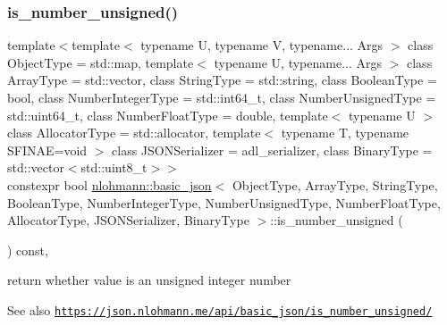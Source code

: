 \subsubsection{\texorpdfstring{is\+\_\+number\+\_\+unsigned()}{is\_number\_unsigned()}}
{\footnotesize\ttfamily template$<$template$<$ typename U, typename V, typename... Args $>$ class Object\+Type = std\+::map, template$<$ typename U, typename... Args $>$ class Array\+Type = std\+::vector, class String\+Type  = std\+::string, class Boolean\+Type  = bool, class Number\+Integer\+Type  = std\+::int64\+\_\+t, class Number\+Unsigned\+Type  = std\+::uint64\+\_\+t, class Number\+Float\+Type  = double, template$<$ typename U $>$ class Allocator\+Type = std\+::allocator, template$<$ typename T, typename S\+F\+I\+N\+A\+E=void $>$ class J\+S\+O\+N\+Serializer = adl\+\_\+serializer, class Binary\+Type  = std\+::vector$<$std\+::uint8\+\_\+t$>$$>$ \\
constexpr bool \hyperlink{classnlohmann_1_1basic__json}{nlohmann\+::basic\+\_\+json}$<$ Object\+Type, Array\+Type, String\+Type, Boolean\+Type, Number\+Integer\+Type, Number\+Unsigned\+Type, Number\+Float\+Type, Allocator\+Type, J\+S\+O\+N\+Serializer, Binary\+Type $>$\+::is\+\_\+number\+\_\+unsigned (\begin{DoxyParamCaption}{ }\end{DoxyParamCaption}) const\hspace{0.3cm}{\ttfamily [inline]}, {\ttfamily [noexcept]}}



return whether value is an unsigned integer number 

\begin{DoxySeeAlso}{See also}
\href{https://json.nlohmann.me/api/basic_json/is_number_unsigned/}{\tt https\+://json.\+nlohmann.\+me/api/basic\+\_\+json/is\+\_\+number\+\_\+unsigned/} 
\end{DoxySeeAlso}
\mbox{\label{classnlohmann_1_1basic__json_a57e8411a770a6263d6d8f2116c37f3aa}} 
